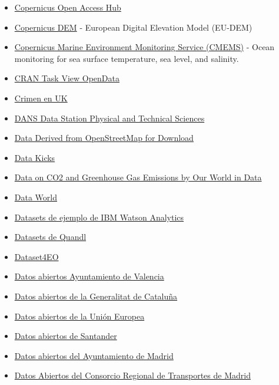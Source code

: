 \documentclass[
]{article}
\begin{document}
\begin{itemize}
\item
  \href{https://scihub.copernicus.eu/dhus/\#/home}{Copernicus Open
  Access Hub}
\item
  \href{https://spacedata.copernicus.eu/collections/copernicus-digital-elevation-model}{Copernicus
  DEM} - European Digital Elevation Model (EU-DEM)
\item
  \href{https://marine.copernicus.eu/}{Copernicus Marine Environment
  Monitoring Service (CMEMS)} - Ocean monitoring for sea surface
  temperature, sea level, and salinity.
\item
  \href{https://github.com/ropensci/opendata}{CRAN Task View OpenData}
\item
  \href{https://data.police.uk/}{Crimen en UK}
\item
  \href{https://phys-techsciences.datastations.nl/}{DANS Data Station
  Physical and Technical Sciences}
\item
  \href{https://osmdata.openstreetmap.de/}{Data Derived from
  OpenStreetMap for Download}
\item
  \href{https://data-kicks.com/index.php/blog/}{Data Kicks}
\item
  \href{https://github.com/owid/co2-data/tree/master}{Data on CO2 and
  Greenhouse Gas Emissions by Our World in Data}
\item
  \href{https://data.world/}{Data World}
\item
  \href{https://www.ibm.com/communities/analytics/watson-analytics-blog/guide-to-sample-datasets/}{Datasets
  de ejemplo de IBM Watson Analytics}
\item
  \href{https://www.quandl.com/search?query=}{Datasets de Quandl}
\item
  \href{https://github.com/EarthNets/Dataset4EO}{Dataset4EO}
\item
  \href{https://www.valencia.es/cas/ayuntamiento/gobierno-abierto}{Datos
  abiertos Ayuntamiento de Valencia}
\item
  \href{http://dadesobertes.gencat.cat/es/}{Datos abiertos de la
  Generalitat de Cataluña}
\item
  \href{https://data.europa.eu/es}{Datos abiertos de la Unión Europea}
\item
  \href{http://datos.santander.es/}{Datos abiertos de Santander}
\item
  \href{http://datos.madrid.es/}{Datos abiertos del Ayuntamiento de
  Madrid}
\item
  \href{https://datos.crtm.es/}{Datos Abiertos del Consorcio Regional de
  Transportes de Madrid}

\end{itemize}
\end{document}
